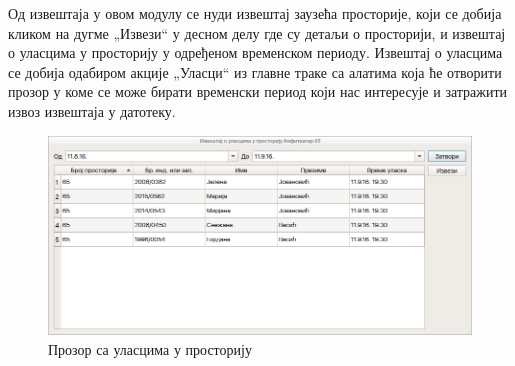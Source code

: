 \documentclass[a4paper, 12pt, diplomski]{etfcyr}
\def\quote#1{„#1“}
\begin{document}
\begin{justify}
					Од извештаја у овом модулу се нуди извештај заузећа просторије, који се добија кликом на дугме \quote{Извези} у десном делу где су детаљи о просторији, и извештај о уласцима у просторију у одређеном временском периоду. Извештај о уласцима се добија одабиром акције \quote{Уласци} из главне траке са алатима која ће отворити прозор у коме се може бирати временски период који нас интересује и затражити извоз извештаја у датотеку.
					\begin{figure}[h]
						\begin{center}
							\includegraphics[width=1\textwidth]{manual/room_entries.png}
						\end{center}
						\caption{Прозор са уласцима у просторију}
						\label{figure:room_entries}
					\end{figure}

				\end{justify}
				
			\newpage
\end{document}
